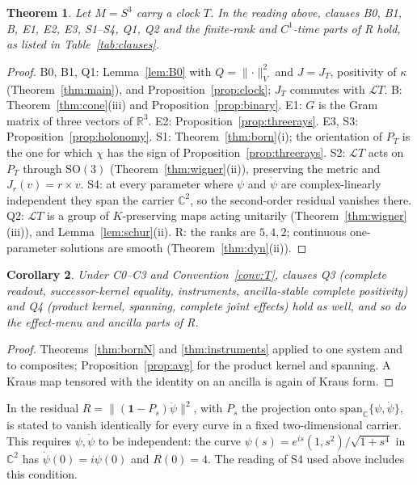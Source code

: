 \documentclass[aps,pra,onecolumn,superscriptaddress,nofootinbib,10pt]{revtex4-2}
\newtheorem{theorem}{Theorem}
\newtheorem{corollary}[theorem]{Corollary}
\theoremstyle{definition}
\theoremstyle{remark}
\newcommand{\R}{\mathbb{R}}
\newcommand{\C}{\mathbb{C}}
\newcommand{\cL}{\mathcal{L}}
\newcommand{\SO}{\mathrm{SO}}
\begin{document}
\begin{theorem}\label{thm:clauses}
Let $M=S^3$ carry a clock $T$.  In the reading above, clauses B0, B1, B, E1, E2, E3, S1--S4, \textsf{Q1}, \textsf{Q2} and
the finite-rank and $C^1$-time parts of R hold, as listed in Table~\ref{tab:clauses}.
\end{theorem}
\begin{proof}
B0, B1, \textsf{Q1}: Lemma~\ref{lem:B0} with $Q=\lVert\cdot\rVert_V^2$ and $J=J_T$, positivity of $\kappa$
(Theorem~\ref{thm:main}), and Proposition~\ref{prop:clock}; $J_T$ commutes with $\cL T$.  B:
Theorem~\ref{thm:cone}(iii) and Proposition~\ref{prop:binary}.  E1: $G$ is the Gram matrix of three
vectors of $\R^3$.  E2: Proposition~\ref{prop:threerays}.  E3, S3: Proposition~\ref{prop:holonomy}.  S1:
Theorem~\ref{thm:born}(i); the orientation of $P_T$ is the one for which $\chi$ has the sign of
Proposition~\ref{prop:threerays}.  S2: $\cL T$ acts on $P_T$ through $\SO(3)$
(Theorem~\ref{thm:wigner}(ii)), preserving the metric and $J_r(v)=r\times v$.  S4: at every parameter where $\psi$ and $\dot\psi$ are complex-linearly independent they span the
carrier $\C^2$, so the second-order residual vanishes there.  \textsf{Q2}: $\cL T$ is a group of
$K$-preserving maps acting unitarily (Theorem~\ref{thm:wigner}(iii)), and Lemma~\ref{lem:schur}(ii).  R:
the ranks are $5,4,2$; continuous one-parameter solutions are smooth (Theorem~\ref{thm:dyn}(ii)).
\end{proof}

\begin{corollary}\label{cor:clausesQ3}
Under C0--C3 and Convention~\ref{conv:T}, clauses \textsf{Q3} (complete readout,
successor-kernel equality, instruments, ancilla-stable complete positivity) and \textsf{Q4} (product kernel,
spanning, complete joint effects) hold as well, and so do the effect-menu and ancilla parts of R.
\end{corollary}
\begin{proof}
Theorems~\ref{thm:bornN} and \ref{thm:instruments} applied to one system and to composites;
Proposition~\ref{prop:avg} for the product kernel and spanning.  A Kraus map tensored with the identity
on an ancilla is again of Kraus form.
\end{proof}

In \cite[\S5.6]{CRQO} the residual $R=\lVert(\mathbf1-P_s)\ddot\psi\rVert^2$, with $P_s$ the projection onto
$\mathrm{span}_\C\{\psi,\dot\psi\}$, is stated to vanish identically for every curve in a fixed
two-dimensional carrier.  This requires $\psi,\dot\psi$ to be independent: the curve
$\psi(s)=e^{is}(1,s^2)/\sqrt{1+s^4}$ in $\C^2$ has $\dot\psi(0)=i\psi(0)$ and $R(0)=4$.  The reading of S4
used above includes this condition.
\end{document}
